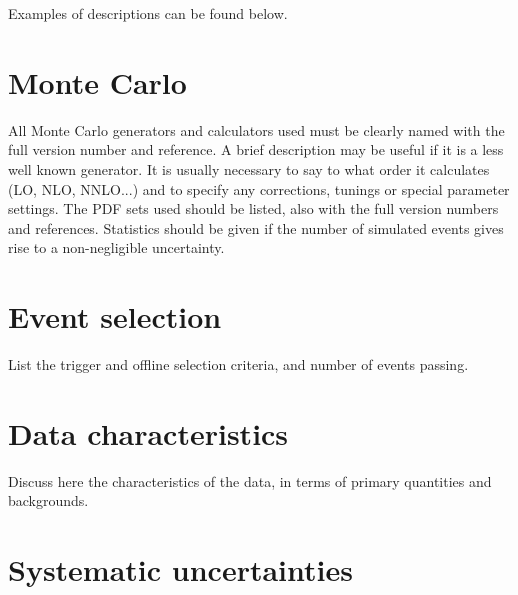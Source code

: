 \documentclass[UKenglish]{latex/atlasdoc}
\begin{document}
Examples of descriptions can be found below.




\section{Monte Carlo}
\label{sec:MC}

All Monte Carlo generators and calculators used must be clearly named with the full version number and reference.
A brief description may be useful if it is a less well known generator.
It is usually necessary to say to what order it calculates (LO, NLO, NNLO...) 
and to specify any corrections, tunings or special parameter settings.
The PDF sets used should be listed, also with the full version numbers and references.
Statistics should be given if the number of simulated events gives rise to a non-negligible uncertainty.


\section{Event selection}
\label{sec:selection}

List the trigger and offline selection criteria, and number of events passing.


\section{Data characteristics}
\label{sec:control}

Discuss here the characteristics of the data, in terms of primary quantities and backgrounds.


\section{Systematic uncertainties}
\label{sec:syst}
\end{document}
